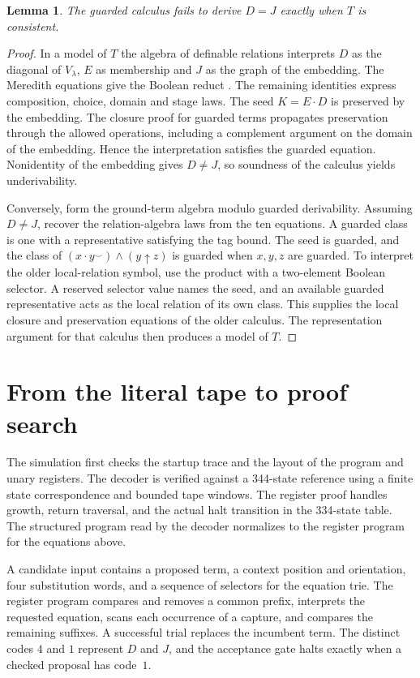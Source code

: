 \documentclass[11pt,letterpaper]{article}
\newtheorem{lemma}[theorem]{Lemma}
\newcommand{\nand}{\mathbin{\uparrow}}
\newcommand{\conv}[1]{#1^{\smile}}
\begin{document}
\begin{lemma}\label{lem:consistent}
The guarded calculus fails to derive $D=J$ exactly when $T$ is
consistent.
\end{lemma}

\begin{proof}
In a model of $T$ the algebra of definable relations interprets $D$ as
the diagonal of $V_\lambda$, $E$ as membership and $J$ as the graph of
the embedding. The Meredith equations give the Boolean reduct
\cite{robbins}. The remaining identities express composition,
choice, domain and stage laws. The seed $K=E\cdot D$ is preserved by
the embedding. The closure proof for guarded terms propagates
preservation through the allowed operations, including a complement
argument on the domain of the embedding. Hence the interpretation
satisfies the guarded equation. Nonidentity of the embedding gives
$D\ne J$, so soundness of the calculus yields underivability.

Conversely, form the ground-term algebra modulo guarded derivability.
Assuming $D\ne J$, recover the relation-algebra laws from the ten
equations. A guarded class is one with a representative satisfying
the tag bound. The seed is guarded, and the class of
$(x\cdot\conv y)\wedge(y\nand z)$ is guarded when $x,y,z$ are
guarded. To interpret the older local-relation symbol, use the product
with a two-element Boolean selector. A reserved selector value names
the seed, and an available guarded representative acts as the
local relation of its own class. This supplies the local closure and
preservation equations of the older calculus. The representation
argument for that calculus then produces a model of $T$.
\end{proof}

\section{From the literal tape to proof search}

The simulation first checks the startup trace and the layout of the
program and unary registers. The decoder is verified against a
344-state reference using a finite state correspondence and bounded
tape windows. The register proof handles growth, return traversal, and
the actual halt transition in the 334-state table. The structured
program read by the decoder normalizes to the register program for
the equations above.

A candidate input contains a proposed term, a context position and
orientation, four substitution words, and a sequence of selectors for
the equation trie. The register program compares and removes a common
prefix, interprets the requested equation, scans each occurrence of a
capture, and compares the remaining suffixes. A successful trial
replaces the incumbent term. The distinct codes $4$ and $1$ represent
$D$ and $J$, and the acceptance gate halts exactly when a checked
proposal has code~$1$.
\end{document}
